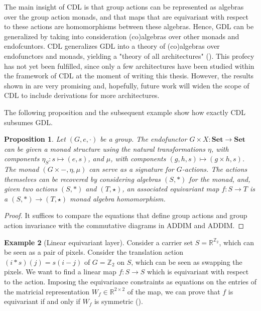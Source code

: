 \documentclass[11pt,a4paper,openright,twoside]{report}
\theoremstyle{plain}
\newtheorem{proposition}{Proposition}
\theoremstyle{definition}
\newtheorem{example}[proposition]{Example}
\begin{document}
The main insight of CDL is that group actions can be represented as algebras over the group action monads, and that maps that are equivariant with respect to these actions are homomorphisms between these algebras. Hence, GDL can be generalized by taking into consideration (co)algebras over other monads and endofcuntors. CDL generalizes GDL into a theory of (co)algebras over endofunctors and monads, yielding a "theory of all architectures" (\cite{gavranovicposition}). This profecy has not yet been fulfilled, since only a few architectures have been studied within the framework of CDL at the moment of writing this thesis. However, the results shown in \cite{gavranovicposition} are very promising and, hopefully, future work will widen the scope of CDL to include derivations for more architectures.

The following proposition and the subsequent example show how exactly CDL subsumes GDL.

\begin{proposition}
  Let $(G,e,\cdot)$ be a group. The endofunctor $G \times X: \mathbf{Set} \to \mathbf{Set}$ can be given a monad structure using the natural transformations $\eta$, with components $\eta_S: s \mapsto (e,s)$, and $\mu$, with components $(g,h,s) \mapsto (g \times h, s)$. 
  The monad $(G \times -, \eta, \mu)$ can serve as a signature for $G$-actions. The actions themselves can be recovered by considering algebras $(S,\ast)$ for the monad, and, given two actions $(S,\ast)$ and $(T,\star)$, an associated equivariant map $f: S \to T$ is a $(S,\ast) \to (T,\star)$ monad algebra homomorphism.
\end{proposition}
\begin{proof}
  It suffices to compare the equations that define group actions and group action invariance with the commutative diagrams in ADDIM and ADDIM.
\end{proof}

\begin{example}[Linear equivariant layer]
  \label{ex: translationaction}
  Consider a carrier set $S = \mathbb{R}^{\mathbb{Z}_2}$, which can be seen as a pair of pixels. Consider the translation action $(i \ast s)(j) = s(i-j)$ of $G = \mathbb{Z}_2$ on $S$, which can be seen as swapping the pixels.
  We want to find a linear map $f: S \to S$ which is equivariant with respect to the action. Imposing the equivariance constraints as equations on the entries of the matricial representation $W_f \in \mathbb{R}^{2 \times 2}$ of the map, we can prove that $f$ is equivariant if and only if $W_f$ is symmetric (\cite{gavranovicposition}).
\end{example}
\end{document}
